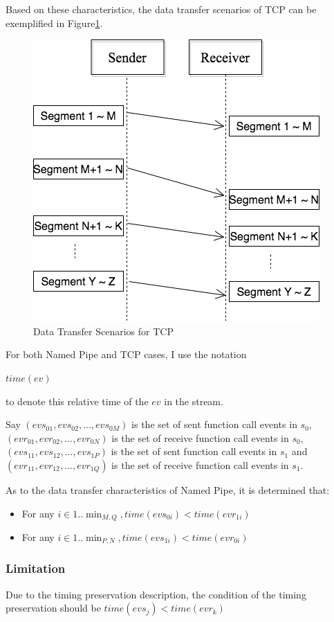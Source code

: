 Based on these characteristics,  the data transfer scenarios of TCP can be exemplified in Figure\ref{tcp}.
\begin{figure}[H]
\centerline{\includegraphics[scale=0.48]{Figures/tcp}}
 \caption{Data Transfer Scenarios for TCP}
\label{tcp}
\end{figure}

For both Named Pipe and TCP cases, I use the notation 

$time(ev)$

to denote this relative time of the $ev$ in the stream. 

Say $(evs_{01},evs_{02},...,evs_{0M})$ is the set of sent function call events in $s_0$,  $(evr_{01},evr_{02},...,evr_{0N})$ is the set of receive function call events in $s_0$, $(evs_{11},evs_{12},...,evs_{1P})$ is the set of sent function call events in $s_1$ and
$(evr_{11},evr_{12},...,evr_{1Q})$ is the set of receive function call events in $s_1$. 

As to the data transfer characteristics of Named Pipe, it is determined that: 
\begin{itemize}
\item For any $i \in {1..\min_{M,Q}}, time(evs_{0i}) < time(evr_{1i})$
\item For any $i \in {1..\min_{P,N}}, time(evs_{1i}) < time(evr_{0i})$
\end{itemize}

\subsubsection{Limitation}
Due to the timing preservation description, the condition of the timing preservation should be $time(evs_j) < time(evr_k)$

